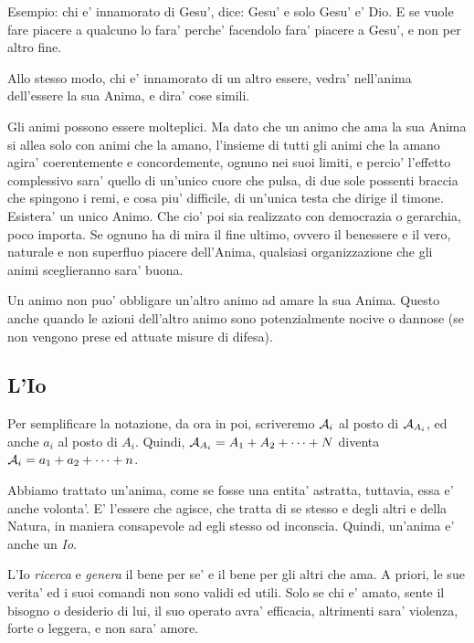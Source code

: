 Esempio: chi e' innamorato di Gesu', dice: Gesu' e solo Gesu' e' Dio. E se vuole fare piacere a qualcuno lo fara' perche' facendolo fara' piacere a Gesu', e non per altro fine. 

Allo stesso modo, chi e' innamorato di un altro essere, vedra' nell'anima dell'essere la sua Anima, e dira' cose simili.

Gli animi possono essere molteplici. Ma dato che un animo che ama la sua Anima si allea solo con animi che la amano, l'insieme di tutti gli animi che la amano agira' coerentemente e concordemente, ognuno nei suoi limiti, e percio' l'effetto complessivo sara' quello di un'unico cuore che pulsa, di due sole possenti braccia che spingono i remi, e cosa piu' difficile, di un'unica testa che dirige il timone. Esistera' un unico Animo. Che cio' poi sia realizzato con democrazia o gerarchia, poco importa. Se ognuno ha di mira il fine ultimo, ovvero il benessere e il vero, naturale e non superfluo piacere dell'Anima, qualsiasi organizzazione che gli animi sceglieranno sara' buona.

Un animo non puo' obbligare un'altro animo ad amare la sua Anima. Questo anche quando le azioni dell'altro animo sono potenzialmente nocive o dannose (se non vengono prese ed attuate misure di difesa).


\def\Dio{D}


\subsection{L'Io}

Per semplificare la notazione, da ora in poi, scriveremo $\mathcal{A}_i$ al posto di $\mathcal{A}_{A_i}$, ed anche $a_i$ al posto di $A_i$. Quindi, $\mathcal{A}_{A_i}=A_1+A_2+\cdots+N$ diventa $\mathcal{A}_i=a_1+a_2+\cdots+n$. %

\def\Io{\textrm{Io}}

\def\esAi{\anima{A}_i}
\def\esAj{\anima{A}_j}
\def\esAE{\anima{A}_E}

    Abbiamo trattato un'anima, come se fosse una entita' astratta, tuttavia, essa e' anche volonta'. E' l'essere che agisce, che tratta di se stesso e degli altri e della Natura, in maniera consapevole ad egli stesso od inconscia. Quindi, un'anima e' anche un \emph{Io}.

    L'Io \emph{ricerca} e \emph{genera} il bene per se' e il bene per gli altri che ama. A priori, le sue verita' ed i suoi comandi non sono validi ed utili. Solo se chi e' amato, sente il bisogno o desiderio di lui, il suo operato avra' efficacia, altrimenti sara' violenza, forte o leggera, e non sara' amore.

